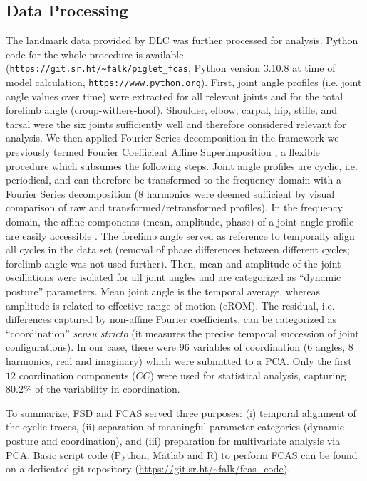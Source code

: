 \subsection{Data Processing}
\label{sec:orgcb0a26c}

The landmark data provided by DLC was further processed for analysis.
Python code for the whole procedure is available (\nolinkurl{https://git.sr.ht/~falk/piglet_fcas}, Python version 3.10.8 at time of model calculation, \nolinkurl{https://www.python.org}).
First, joint angle profiles (i.e. joint angle values over time) were extracted for all relevant joints and for the total forelimb angle (croup-withers-hoof).
Shoulder, elbow, carpal, hip, stifle, and tarsal were the six joints sufficiently well  and therefore considered relevant for analysis.
We then applied Fourier Series decomposition in the framework we previously termed Fourier Coefficient Affine Superimposition \citep[FCAS,][and Ch. \ref{cpt:fourier_review}]{Mielke2019}, a flexible procedure which subsumes the following steps.
Joint angle profiles are cyclic, i.e. periodical, and can therefore be transformed to the frequency domain with a Fourier Series decomposition (8 harmonics were deemed sufficient by visual comparison of raw and transformed/retransformed profiles).
In the frequency domain, the affine components (mean, amplitude, phase) of a joint angle profile are easily accessible \citep[\textit{cf.}][and Ch. \ref{cpt:fcas}]{Mielke2019}.
The forelimb angle served as reference to temporally align all cycles in the data set (removal of phase differences between different cycles; forelimb angle was not used further).
Then, mean and amplitude of the joint oscillations were isolated for all joint angles and are categorized as ``dynamic posture'' parameters.
Mean joint angle is the temporal average, whereas amplitude is related to effective range of motion (eROM).
The residual, i.e. differences captured by non-affine Fourier coefficients, can be categorized as ``coordination'' \emph{sensu stricto} (it measures the precise temporal succession of joint configurations).
In our case, there were
\(96\)
variables of coordination (6  angles, 8 harmonics, real and imaginary) which were submitted to a PCA.
Only the first
\(12\)
coordination components (\(CC\)) were used for statistical analysis, capturing
\(80.2 \%\)
of the variability in coordination.

To summarize, FSD and FCAS served three purposes: (i) temporal alignment of the cyclic traces, (ii) separation of meaningful parameter categories (dynamic posture and coordination), and (iii) preparation for multivariate analysis via PCA.
Basic script code (Python, Matlab and R) to perform FCAS can be found on a dedicated git repository (\url{https://git.sr.ht/\~falk/fcas\_code}).


